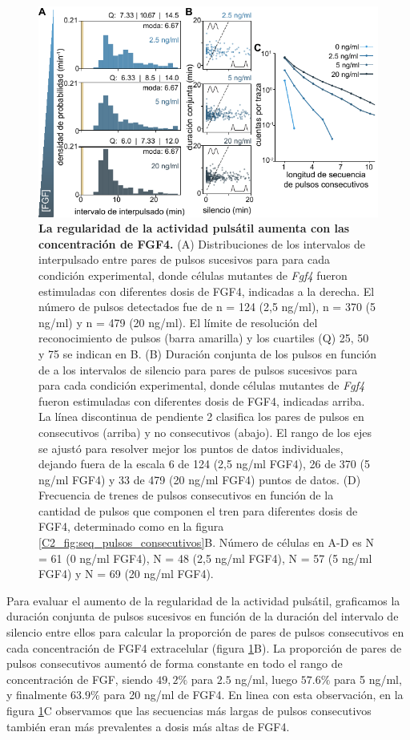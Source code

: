 \documentclass[./main.tex]{subfiles}
\begin{document}
\begin{figure}
    \centering
    \includegraphics[width=1\columnwidth]{figures/chapter3/C3_FGF_consecutive.pdf} \caption{\textbf{La regularidad de la actividad pulsátil aumenta con las concentración de FGF4.} (A) Distribuciones de los intervalos de interpulsado entre pares de pulsos sucesivos para para cada condición experimental, donde células mutantes de \textit{Fgf4} fueron estimuladas con diferentes dosis de FGF4, indicadas a la derecha. El número de pulsos detectados fue de n = 124 (2,5 ng/ml), n = 370 (5 ng/ml) y n = 479 (20 ng/ml). El límite de resolución del reconocimiento de pulsos (barra amarilla) y los cuartiles (Q) 25, 50 y 75 se indican en B. (B) Duración conjunta de los pulsos en función de a los intervalos de silencio para pares de pulsos sucesivos para para cada condición experimental, donde células mutantes de \textit{Fgf4} fueron estimuladas con diferentes dosis de FGF4, indicadas arriba. La línea discontinua de pendiente 2 clasifica los pares de pulsos en consecutivos (arriba) y no consecutivos (abajo). El rango de los ejes se ajustó para resolver mejor los puntos de datos individuales, dejando fuera de la escala 6 de 124 (2,5 ng/ml FGF4), 26 de 370 (5 ng/ml FGF4) y 33 de 479 (20 ng/ml FGF4) puntos de datos. (D) Frecuencia de trenes de pulsos consecutivos en función de la cantidad de pulsos que componen el tren para diferentes dosis de FGF4, determinado como en la figura \ref{C2_fig:seq_pulsos_consecutivos}B. Número de células en A-D es N = 61 (0 ng/ml FGF4), N = 48 (2,5 ng/ml FGF4), N = 57 (5 ng/ml FGF4) y N = 69 (20 ng/ml FGF4).}
    \label{C3_fig:FGF_consecutive}
\end{figure}
 

Para evaluar el aumento de la regularidad de la actividad pulsátil, graficamos la duración conjunta de pulsos sucesivos en función de la duración del intervalo de silencio entre ellos para calcular la proporción de pares de pulsos consecutivos en cada concentración de FGF4 extracelular (figura \ref{C3_fig:FGF_consecutive}B). La proporción de pares de pulsos consecutivos aumentó de forma constante en todo el rango de concentración de FGF, siendo $49,2 \% $ para $2.5$ ng/ml, luego $57.6\%$ para 5 ng/ml, y finalmente $63.9\%$ para 20 ng/ml de FGF4. En linea con esta observación, en la figura \ref{C3_fig:FGF_consecutive}C observamos que las secuencias más largas de pulsos consecutivos también eran más prevalentes a dosis más altas de FGF4.
\end{document}
